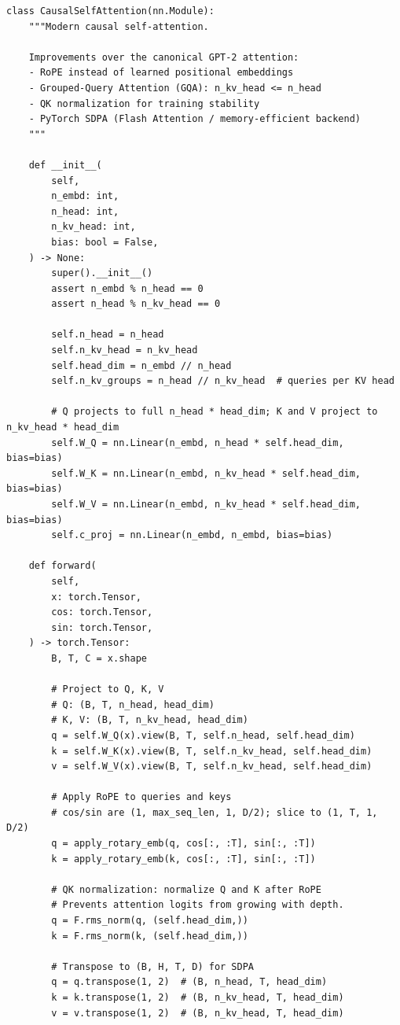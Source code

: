 \begin{lstlisting}
class CausalSelfAttention(nn.Module):
    """Modern causal self-attention.

    Improvements over the canonical GPT-2 attention:
    - RoPE instead of learned positional embeddings
    - Grouped-Query Attention (GQA): n_kv_head <= n_head
    - QK normalization for training stability
    - PyTorch SDPA (Flash Attention / memory-efficient backend)
    """

    def __init__(
        self,
        n_embd: int,
        n_head: int,
        n_kv_head: int,
        bias: bool = False,
    ) -> None:
        super().__init__()
        assert n_embd % n_head == 0
        assert n_head % n_kv_head == 0

        self.n_head = n_head
        self.n_kv_head = n_kv_head
        self.head_dim = n_embd // n_head
        self.n_kv_groups = n_head // n_kv_head  # queries per KV head

        # Q projects to full n_head * head_dim; K and V project to n_kv_head * head_dim
        self.W_Q = nn.Linear(n_embd, n_head * self.head_dim, bias=bias)
        self.W_K = nn.Linear(n_embd, n_kv_head * self.head_dim, bias=bias)
        self.W_V = nn.Linear(n_embd, n_kv_head * self.head_dim, bias=bias)
        self.c_proj = nn.Linear(n_embd, n_embd, bias=bias)

    def forward(
        self,
        x: torch.Tensor,
        cos: torch.Tensor,
        sin: torch.Tensor,
    ) -> torch.Tensor:
        B, T, C = x.shape

        # Project to Q, K, V
        # Q: (B, T, n_head, head_dim)
        # K, V: (B, T, n_kv_head, head_dim)
        q = self.W_Q(x).view(B, T, self.n_head, self.head_dim)
        k = self.W_K(x).view(B, T, self.n_kv_head, self.head_dim)
        v = self.W_V(x).view(B, T, self.n_kv_head, self.head_dim)

        # Apply RoPE to queries and keys
        # cos/sin are (1, max_seq_len, 1, D/2); slice to (1, T, 1, D/2)
        q = apply_rotary_emb(q, cos[:, :T], sin[:, :T])
        k = apply_rotary_emb(k, cos[:, :T], sin[:, :T])

        # QK normalization: normalize Q and K after RoPE
        # Prevents attention logits from growing with depth.
        q = F.rms_norm(q, (self.head_dim,))
        k = F.rms_norm(k, (self.head_dim,))

        # Transpose to (B, H, T, D) for SDPA
        q = q.transpose(1, 2)  # (B, n_head, T, head_dim)
        k = k.transpose(1, 2)  # (B, n_kv_head, T, head_dim)
        v = v.transpose(1, 2)  # (B, n_kv_head, T, head_dim)


\end{lstlisting}
